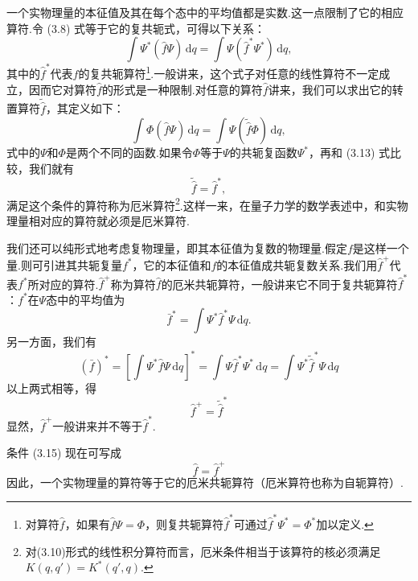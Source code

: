 一个实物理量的本征值及其在每个态中的平均值都是实数.这一点限制了它的相应算符.令 (3.8) 式等于它的复共轭式，可得以下关系：
\begin{equation}
  \int\varPsi^{*}(\hat{f}\varPsi)\,\mathrm{d}q
  =\int\varPsi(\hat{f}^{*}\varPsi^{*})\,\mathrm{d}q,
\end{equation}
其中的$\hat{f}^{*}$代表$\hat{f}$的复共轭算符\footnote{对算符$\hat{f}$，如果有$\hat{f}\varPsi=\varPhi$，则复共轭算符$\hat{f}^{*}$可通过$\hat{f}^{*}\varPsi^{*}=\varPhi^{*}$加以定义.}.一般讲来，这个式子对任意的线性算符不一定成立，因而它对算符$\hat{f}$的形式是一种限制.对任意的算符$\hat{f}$讲来，我们可以求出它的转置算符$\tilde{\hat{f}}$，其定义如下：
\begin{equation}
  \int\varPhi(\hat{f}\varPsi)\,\mathrm{d}q
  =\int\varPsi(\tilde{\hat{f}}\varPhi)\,\mathrm{d}q,
\end{equation}
式中的$\varPsi$和$\varPhi$是两个不同的函数.如果令$\varPhi$等于$\varPsi$的共轭复函数$\varPsi^{*}$，再和 (3.13) 式比较，我们就有
\begin{equation}
  \tilde{\hat{f}}=\hat{f}^{*},
\end{equation}
满足这个条件的算符称为厄米算符\footnote{对(3.10)形式的线性积分算符而言，厄米条件相当于该算符的核必须满足$K(q,q')=K^{*}(q',q)$.}.这样一来，在量子力学的数学表述中，和实物理量相对应的算符就必须是厄米算符.

我们还可以纯形式地考虑复物理量，即其本征值为复数的物理量.假定$f$是这样一个量.则可引进其共轭复量$f^{*}$，它的本征值和$f$的本征值成共轭复数关系.我们用$\hat{f}^{+}$代表$f^{*}$所对应的算符.$\hat{f}^{+}$称为算符$\hat{f}$的厄米共轭算符，一般讲来它不同于复共轭算符$\hat{f}^{*}$：$f^{*}$在$\varPsi$态中的平均值为
\begin{equation*}
  \bar{f}^{*}=\int\varPsi^{*}\hat{f}^{*}\varPsi\,\mathrm{d}q.
\end{equation*}
另一方面，我们有
\begin{equation*}
  (\bar{f})^{*}=\left[\int\varPsi^{*}\hat{f}\varPsi\,\mathrm{d}q\right]^{*}
  =\int\varPsi\hat{f}^{*}\varPsi^{*}\,\mathrm{d}q
  =\int\varPsi^{*}\tilde{\hat{f}}^{*}\varPsi\,\mathrm{d}q
\end{equation*}
以上两式相等，得
\begin{equation}
  \hat{f}^{+}=\tilde{\hat{f}}^{*}
\end{equation}
显然，$\hat{f}^{+}$一般讲来并不等于$\hat{f}^{*}$.

条件 (3.15) 现在可写成
\begin{equation}
  \hat{f}=\hat{f}^{+}
\end{equation}
因此，一个实物理量的算符等于它的厄米共轭算符（厄米算符也称为自轭算符）.

